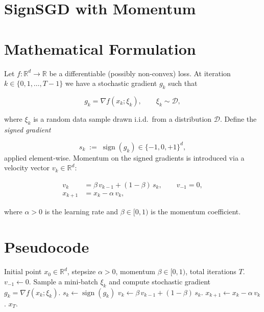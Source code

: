\documentclass{article}
\newcommand{\sign}{\operatorname{sign}}
\newcommand{\R}{\mathbb{R}}
\begin{document}
\section*{SignSGD with Momentum}

\section*{Mathematical Formulation}
Let $f:\R^{d}\rightarrow\R$ be a differentiable (possibly non‑convex) loss.  
At iteration $k\in\{0,1,\dots,T-1\}$ we have a stochastic gradient $g_k$ such that  

\[
g_k = \nabla f(x_k;\xi_k),\qquad \xi_k\sim\mathcal{D},
\]

where $\xi_k$ is a random data sample drawn i.i.d.\ from a distribution $\mathcal{D}$.
Define the \emph{signed gradient}  

\[
s_k \;:=\; \sign(g_k)\in\{-1,0,+1\}^{d},
\]
applied element‑wise.  
Momentum on the signed gradients is introduced via a velocity vector $v_k\in\R^{d}$:

\[
\boxed{
\begin{aligned}
v_{k}      &= \beta\,v_{k-1} + (1-\beta)\,s_{k}, \qquad v_{-1}=0,\\[4pt]
x_{k+1}    &= x_{k} - \alpha \, v_{k},
\end{aligned}}
\tag{1}
\]

where $\alpha>0$ is the learning rate and $\beta\in[0,1)$ is the momentum coefficient.

\section*{Pseudocode}
\begin{algorithm}[H]
\caption{SignSGD with Momentum}
\begin{algorithmic}[1]
\REQUIRE Initial point $x_{0}\in\R^{d}$, stepsize $\alpha>0$, momentum $\beta\in[0,1)$, total iterations $T$.
\STATE $v_{-1}\gets 0$.
    \STATE Sample a mini‑batch $\xi_k$ and compute stochastic gradient $g_k=\nabla f(x_k;\xi_k)$.
    \STATE $s_k \gets \sign(g_k)$ \hfill{}
    \STATE $v_k \gets \beta\,v_{k-1}+(1-\beta)\,s_k$.
    \STATE $x_{k+1} \gets x_k - \alpha\,v_k$.
\ENDFOR
\RETURN $x_T$.
\end{algorithmic}
\end{algorithm}
\end{document}
